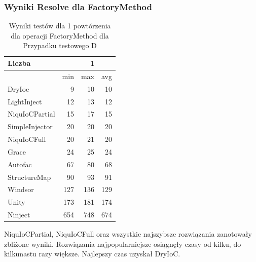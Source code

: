 \documentclass[12pt]{article}
\begin{document}
\subsubsection{Wyniki Resolve dla FactoryMethod}
\begin{table}[H]
\captionsetup{belowskip=0pt,aboveskip=0pt}
\begin{center}
\begin{small}
	\begin{tabular}{ | l | r r r | }
    		\hline
Liczba & & 1 & \\ \hline
 & min & max & avg \\ \hline
DryIoc & 9 & 10 & 10 \\ \hline
LightInject & 12 & 13 & 12 \\ \hline
NiquIoCPartial & 15 & 17 & 15 \\ \hline
SimpleInjector & 20 & 20 & 20 \\ \hline
NiquIoCFull & 20 & 21 & 20 \\ \hline
Grace & 24 & 25 & 24 \\ \hline
Autofac & 67 & 80 & 68 \\ \hline
StructureMap & 90 & 93 & 91 \\ \hline
Windsor & 127 & 136 & 129 \\ \hline
Unity & 173 & 181 & 174 \\ \hline
Ninject & 654 & 748 & 674 \\ \hline
  	\end{tabular}
\end{small}
\end{center}
\caption{Wyniki testów dla 1 powtórzenia dla operacji FactoryMethod dla Przypadku testowego D}
\label{TestCaseB_FactoryMethod1}
\end{table}
NiquIoCPartial, NiquIoCFull oraz wszystkie najszybsze rozwiązania zanotowały zbliżone wyniki. Rozwiązania najpopularniejsze osiągnęły czasy od kilku, do kilkunastu razy większe. Najlepszy czas uzyskał DryIoC.
\\ \\
\end{document}
